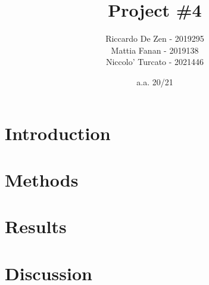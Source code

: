 \documentclass[11pt]{article}
\title{Project \#4}
\author{Riccardo De Zen - 2019295 \\ Mattia Fanan - 2019138 \\ Niccolo' Turcato - 2021446}
\date{a.a. 20/21}
\begin{document}
\maketitle
\tableofcontents

\newpage

\section{Introduction}


\section{Methods}


\section{Results}


\section{Discussion}

\end{document}
